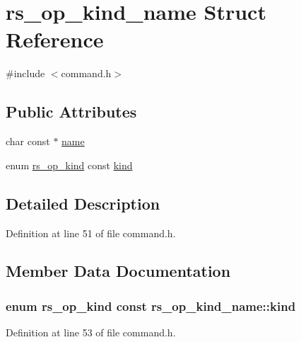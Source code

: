 \hypertarget{structrs__op__kind__name}{}\section{rs\+\_\+op\+\_\+kind\+\_\+name Struct Reference}
\label{structrs__op__kind__name}


{\ttfamily \#include $<$command.\+h$>$}

\subsection*{Public Attributes}
\begin{DoxyCompactItemize}
\item 
char const $\ast$ \hyperlink{structrs__op__kind__name_a42bca1e2e3eade13c85555ff26ce3980}{name}
\item 
enum \hyperlink{command_8h_a86c9292a5b5238cddbe4d0a158414c80}{rs\+\_\+op\+\_\+kind} const \hyperlink{structrs__op__kind__name_a3b376fedd349e40880c24fbe2cac5676}{kind}
\end{DoxyCompactItemize}


\subsection{Detailed Description}


Definition at line 51 of file command.\+h.



\subsection{Member Data Documentation}
\hypertarget{structrs__op__kind__name_a3b376fedd349e40880c24fbe2cac5676}{}
\subsubsection[{kind}]{\setlength{\rightskip}{0pt plus 5cm}enum {\bf rs\+\_\+op\+\_\+kind} const rs\+\_\+op\+\_\+kind\+\_\+name\+::kind}\label{structrs__op__kind__name_a3b376fedd349e40880c24fbe2cac5676}


Definition at line 53 of file command.\+h.

\hypertarget{structrs__op__kind__name_a42bca1e2e3eade13c85555ff26ce3980}{}
